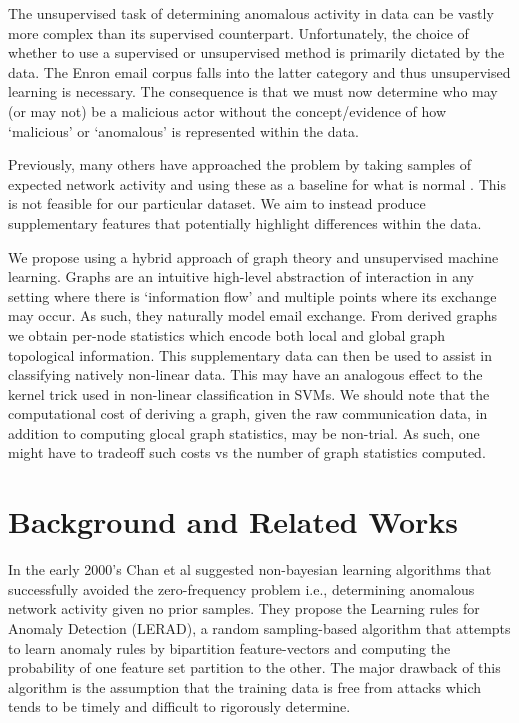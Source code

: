 \documentclass[11pt,letterpaper]{article}
\begin{document}
The unsupervised task of determining anomalous activity in data can be vastly more
complex than its supervised counterpart. Unfortunately, the choice of whether to use
a supervised or unsupervised method is primarily dictated by the data. The Enron email
corpus falls into the latter category and thus unsupervised learning is necessary.
The consequence is that we must now determine who may (or may not) be a malicious
actor without the concept/evidence of how `malicious' or `anomalous' is represented within
the data.

Previously, many others have approached the problem by taking
samples of expected network activity and using these as a baseline for what is
normal \cite{chan2003machine,stein2005decision}. This is not feasible for our
particular dataset. We aim to instead produce supplementary features that potentially
highlight differences within the data.

We propose using a hybrid approach of graph theory and unsupervised machine learning.
Graphs are an intuitive high-level abstraction of interaction in any setting where
there is `information flow' and multiple points where its exchange may occur. As 
such, they naturally model email exchange. From derived graphs we obtain per-node
statistics which encode both local and global graph topological information. This
supplementary data can then be used to assist in classifying natively non-linear data.
This may have an analogous effect to the kernel trick used in non-linear 
classification in SVMs. %
We should note that the computational cost of deriving a graph, given the
raw communication data, in addition to computing glocal graph statistics, may
be non-trial. As such, one might have to tradeoff such costs vs the number of graph
statistics computed.

\section{Background and Related Works}
In the early 2000's Chan et al \cite{chan2003machine} suggested non-bayesian 
learning algorithms that successfully avoided the zero-frequency problem i.e., determining
anomalous network activity given no prior samples. They propose the Learning rules for Anomaly
Detection (LERAD), a random sampling-based algorithm that attempts to learn anomaly
rules by bipartition feature-vectors and computing the probability of one feature set
partition to the other. The major drawback of this algorithm is the assumption that the 
training data is free from attacks which tends to be timely and difficult to rigorously
determine.
\end{document}
